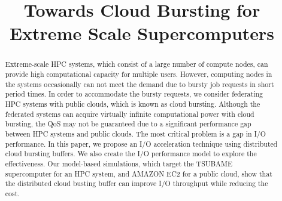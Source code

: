 \documentclass[JIP,draft]{ipsj}
\begin{document}
\title{Towards Cloud Bursting for Extreme Scale Supercomputers}

\begin{abstract}


Extreme-scale HPC systems, which consist of a large number of compute nodes, can provide high computational capacity for multiple users. However, computing nodes in the systems occasionally can not meet the demand due to bursty job requests in short period times. In order to accommodate the bursty requests, we consider federating HPC systems with public clouds, which is known as cloud bursting. Although the federated systems can acquire virtually infinite computational power with cloud bursting, the QoS may not be guaranteed due to a significant performance gap between HPC systems and public clouds. The most critical problem is a gap in I/O performance. In this paper, we propose an I/O acceleration technique using distributed cloud bursting buffers. We also create the I/O performance model to explore the effectiveness. Our model-based simulations, which target the TSUBAME supercomputer for an HPC system, and AMAZON EC2 for a public cloud, show that the distributed cloud busting buffer can improve I/O throughput while reducing the cost.

\end{abstract}
\end{document}
